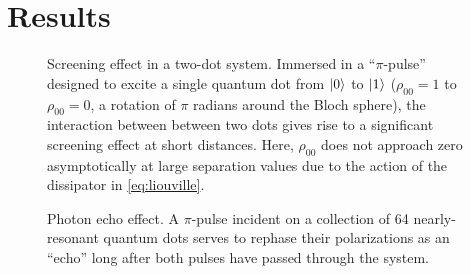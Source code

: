\documentclass[conference]{IEEEtran}
\begin{document}
\section{Results}

\begin{figure}
  \centering
  
  \caption{\label{fig:screening} Screening effect in a two-dot system.
  Immersed in a ``$\pi$-pulse'' designed to excite a single quantum dot from $\ket{0}$ to $\ket{1}$ ($\rho_{00} = 1$ to $\rho_{00} = 0$, a rotation of $\pi$ radians around the Bloch sphere), the interaction between between two dots gives rise to a significant screening effect at short distances.
  Here, $\rho_{00}$ does not approach zero asymptotically at large separation values due to the action of the dissipator in \cref{eq:liouville}.
  }
\end{figure}

\begin{figure}
  \centering
  
  \caption{\label{fig:echo} Photon echo effect. 
    A $\pi$-pulse incident on a collection of 64 nearly-resonant quantum dots serves to rephase their polarizations as an ``echo'' long after both pulses have passed through the system.
  }
\end{figure}
\end{document}
